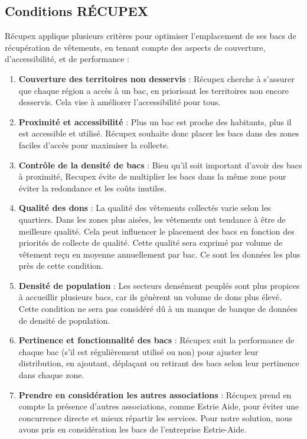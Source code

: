 \documentclass[11pt]{article}
\begin{document}
\subsection{Conditions RÉCUPEX}
Récupex applique plusieurs critères pour optimiser l’emplacement de ses bacs de récupération de vêtements, en tenant compte des aspects de couverture, d'accessibilité, et de performance :

\begin{enumerate}
    \item \textbf{Couverture des territoires non desservis} : Récupex cherche à s’assurer que chaque région a accès à un bac, en priorisant les territoires non encore desservis. Cela vise à améliorer l’accessibilité pour tous.

    \item \textbf{Proximité et accessibilité} : Plus un bac est proche des habitants, plus il est accessible et utilisé. Récupex souhaite donc placer les bacs dans des zones faciles d’accès pour maximiser la collecte.

    \item \textbf{Contrôle de la densité de bacs} : Bien qu’il soit important d’avoir des bacs à proximité, Recupex évite de multiplier les bacs dans la même zone pour éviter la redondance et les coûts inutiles.

    \item\textbf{Qualité des dons} : La qualité des vêtements collectés varie selon les quartiers. Dans les zones plus aisées, les vêtements ont tendance à être de meilleure qualité. Cela peut influencer le placement des bacs en fonction des priorités de collecte de qualité. Cette qualité sera exprimé par volume de vêtement reçu en moyenne annuellement par bac. Ce sont les données les plus près de cette condition.

    \item\textbf{Densité de population} : Les secteurs densément peuplés sont plus propices à accueillir plusieurs bacs, car ils génèrent un volume de dons plus élevé. Cette condition ne sera pas considéré dû à un manque de banque de données de densité de population.

    \item\textbf{Pertinence et fonctionnalité des bacs} : Récupex suit la performance de chaque bac (s’il est régulièrement utilisé ou non) pour ajuster leur distribution, en ajoutant, déplaçant ou retirant des bacs selon leur pertinence dans chaque zone.

    \item\textbf{Prendre en considération les autres associations} : Récupex prend en compte la présence d’autres associations, comme Estrie Aide, pour éviter une concurrence directe et mieux répartir les services. Pour notre solution, nous avons pris en considération les bacs de l'entreprise Estrie-Aide.


\end{enumerate}
\end{document}
